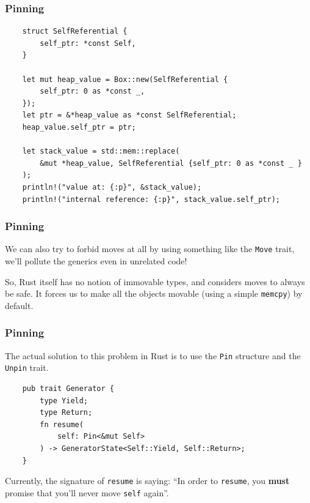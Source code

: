\documentclass[aspectratio=1610,t]{beamer}
\begin{document}

\begin{frame}[fragile]
\frametitle{Pinning}
\begin{verbatim}
    struct SelfReferential {
        self_ptr: *const Self,
    }

    let mut heap_value = Box::new(SelfReferential {
        self_ptr: 0 as *const _,
    });
    let ptr = &*heap_value as *const SelfReferential;
    heap_value.self_ptr = ptr;

    let stack_value = std::mem::replace(
        &mut *heap_value, SelfReferential {self_ptr: 0 as *const _ }
    );
    println!("value at: {:p}", &stack_value);
    println!("internal reference: {:p}", stack_value.self_ptr);
\end{verbatim}
\end{frame}


\begin{frame}[fragile]
\frametitle{Pinning}
We can also try to forbid moves at all by using something like the \texttt{Move} trait, we'll pollute the generics even in unrelated code!

So, Rust itself has no notion of immovable types, and considers moves to always be safe. It forces us to make all the objects movable (using a simple \texttt{memcpy}) by default.
\end{frame}


\begin{frame}[fragile]
\frametitle{Pinning}
The actual solution to this problem in Rust is to use the \texttt{Pin} structure and the \texttt{Unpin} trait.

\begin{verbatim}
    pub trait Generator {
        type Yield;
        type Return;
        fn resume(
            self: Pin<&mut Self>
        ) -> GeneratorState<Self::Yield, Self::Return>;
    }
\end{verbatim}

Currently, the signature of \texttt{resume} is saying: ``In order to \texttt{resume}, you \textbf{must} promise that you'll never move \texttt{self} again''.
\end{frame}

\end{document}
